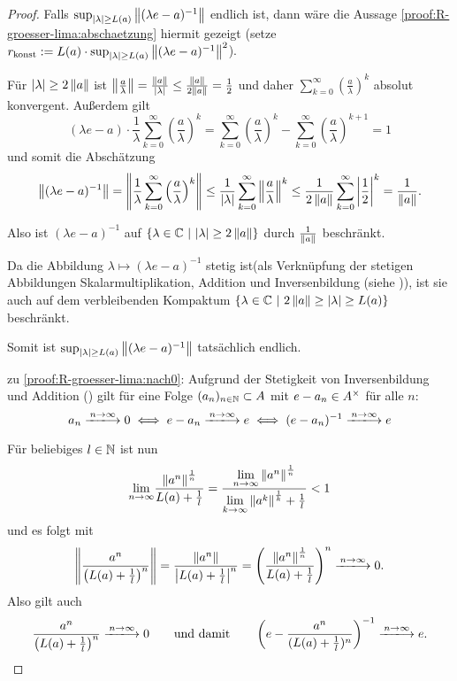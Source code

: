 \begin{proof}
Falls $\sup_{|\lambda| \geq L(a)}\left\lVert(\lambda e - a)^{-1}\right\rVert$ endlich ist, dann wäre die Aussage \ref{proof:R-groesser-lima:abschaetzung} hiermit gezeigt (setze $r_\textup{konst} := L(a) \cdot \sup_{|\lambda| \geq L(a)}\left\lVert(\lambda e - a)^{-1}\right\rVert^2$).

Für $|\lambda| \geq 2\left\lVert a\right\rVert$ ist $\left\lVert\frac{a}{\lambda}\right\rVert = \frac{\left\lVert a\right\rVert}{|\lambda|} \leq \frac{\left\lVert a\right\rVert}{2\left\lVert a\right\rVert} = \frac{1}{2}$ und daher $\sum_{k=0}^\infty \left(\frac{a}{\lambda}\right)^k$ absolut konvergent. Außerdem gilt
	\[(\lambda e - a)\cdot \frac{1}{\lambda}\sum_{k=0}^\infty \left(\frac{a}{\lambda}\right)^k = \sum_{k=0}^\infty \left(\frac{a}{\lambda}\right)^k - \sum_{k=0}^\infty \left(\frac{a}{\lambda}\right)^{k+1} = 1\]
und somit die Abschätzung
	\[\left\lVert(\lambda e - a)^{-1}\right\rVert = \left\lVert\frac{1}{\lambda}\sum_{k=0}^\infty \left(\frac{a}{\lambda}\right)^k\right\rVert \leq \frac{1}{|\lambda|}\sum_{k=0}^\infty\left\lVert\frac{a}{\lambda}\right\rVert^k \leq \frac{1}{2\left\lVert a\right\rVert}\sum_{k=0}^\infty\left|\frac{1}{2}\right|^k = \frac{1}{\left\lVert a\right\rVert}. \]

Also ist $(\lambda e - a)^{-1}$ auf $\{\lambda \in \mathbb{C} ~|~ |\lambda| \geq 2\left\lVert a\right\rVert\}$ durch $\frac{1}{\left\lVert a\right\rVert}$ beschränkt.

Da die Abbildung $\lambda \mapsto (\lambda e - a)^{-1}$ stetig ist(als Verknüpfung der stetigen Abbildungen Skalarmultiplikation, Addition und Inversenbildung (siehe )), ist sie auch auf dem verbleibenden Kompaktum $\{\lambda \in \mathbb{C} ~|~ 2\left\lVert a\right\rVert \geq |\lambda| \geq L(a)\}$ beschränkt. 

Somit ist $\sup_{|\lambda| \geq L(a)}\left\lVert(\lambda e - a)^{-1}\right\rVert$ tatsächlich endlich.


zu \ref{proof:R-groesser-lima:nach0}:
Aufgrund der Stetigkeit von Inversenbildung und Addition () gilt für eine Folge $(a_n)_{n\in\mathbb{N}} \subset A$ mit $e - a_n \in A^\times$ für alle $n$:
	\[a_n \xlongrightarrow{n\to\infty} 0 \iff e - a_n  \xlongrightarrow{n\to\infty} e \iff (e-a_n)^{-1} \xlongrightarrow{n\to\infty} e\]

Für beliebiges $l \in \mathbb{N}$ ist nun 
	\[\underset{n\to \infty}{\lim}\frac{\left\lVert a^n\right\rVert^\frac{1}{n}}{L(a)+\frac{1}{l}} = \frac{\underset{n\to \infty}{\lim}\left\lVert a^n\right\rVert^\frac{1}{n}}{\underset{k\to\infty}{\lim}\left\lVert a^k\right\rVert^\frac{1}{k}+\frac{1}{l}} < 1\]
und es folgt mit 
	\[\norm{\frac{a^n}{\left(\lima+\frac{1}{l}\right)^n}} = \frac{\norm{a^n}}{\left|\lima+\frac{1}{l}\right|^n} = \left(\frac{\norm{a^n}^\frac{1}{n}}{\lima+\frac{1}{l}}\right)^n \xlongrightarrow{n\to\infty} 0.\]
Also gilt auch
	\[\frac{a^n}{\left(\lima+\frac{1}{l}\right)^n} \xlongrightarrow{n\to\infty} 0 \qquad \text{und damit} \qquad \left(e - \frac{a^n}{(\lima+\frac{1}{l})^n}\right)^{-1} \xlongrightarrow{n\to\infty} e.\]


\end{proof}
